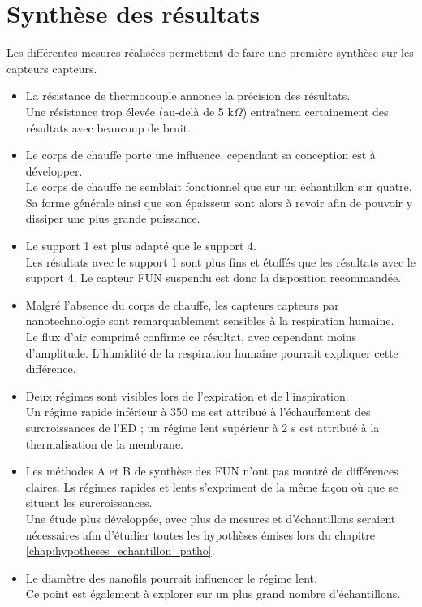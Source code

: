 \section{Synthèse des résultats}
Les différentes mesures réalisées permettent de faire une première synthèse sur les capteurs \gls{capteur}s. 
\begin{itemize}
    \item La résistance de thermocouple annonce la précision des résultats. \\
          Une résistance trop élevée (au-delà de 5 k$\Omega$) entraînera certainement des résultats avec beaucoup de bruit. \\
          
    \item Le corps de chauffe porte une influence, cependant sa conception est à développer.\\
          Le corps de chauffe ne semblait fonctionnel que sur un échantillon sur quatre. Sa forme générale ainsi que son épaisseur sont alors à 
          revoir afin de pouvoir y dissiper une plus grande puissance. \\
          
    \item Le support 1 est plus adapté que le support 4. \\
          Les résultats avec le support 1 sont plus fins et étoffés que les résultats avec le support 4. Le capteur FUN suspendu est donc la disposition 
          recommandée. \\
          
    \item Malgré l'absence du corps de chauffe, les capteurs \gls{capteur}s par nanotechnologie sont remarquablement sensibles à la respiration humaine. \\
          Le flux d'air comprimé confirme ce résultat, avec cependant moins d'amplitude. L'humidité de la respiration humaine pourrait expliquer cette différence.\\
          
    \item Deux régimes sont visibles lors de l'expiration et de l'inspiration.\\
          Un régime rapide inférieur à 350 ms est attribué à l'échauffement des surcroissances de l'ED ; un régime lent supérieur à 2 s est attribué à 
          la thermalisation de la membrane.\\
          
    \item Les méthodes A et B de synthèse des FUN n'ont pas montré de différences claires. Ls régimes rapides et lents s'expriment de la même
          façon où que se situent les surcroissances.  \\
          Une étude plus développée, avec plus de mesures et d'échantillons seraient nécessaires afin d'étudier toutes les hypothèses émises lors du chapitre 
          \ref{chap:hypotheses_echantillon_patho}. \\
          
    \item Le diamètre des nanofils pourrait influencer le régime lent. \\
          Ce point est également à explorer sur un plus grand nombre d'échantillons. \\
\end{itemize}

